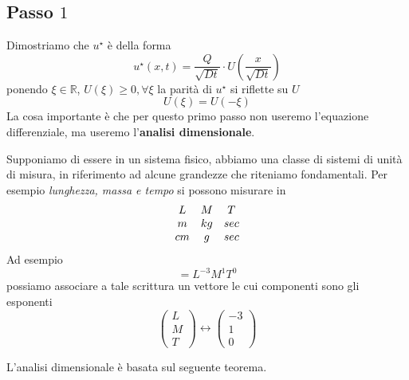 \documentclass[10pt,a4paper,twoside,openright]{book}
\begin{document}
\subsection{Passo \texorpdfstring{$1$}{1}}

Dimostriamo che $u^{\star }$ è della forma
\begin{equation*}
u^{\star }(x,t) =\frac{Q}{\sqrt{Dt}} \cdotp U\left(\frac{x}{\sqrt{Dt}}\right)
\end{equation*}
ponendo $\xi \in \mathbb{R}$, $U(\xi) \geqslant 0,\forall \xi $ la parità di $u^{\star }$ si riflette su $U$
\begin{equation*}
U(\xi) =U(-\xi)
\end{equation*}
La cosa importante è che per questo primo passo non useremo l'equazione differenziale, ma useremo l'\textbf{analisi dimensionale}.
\begin{oss}
 Supponiamo di essere in un sistema fisico, abbiamo una classe di sistemi di unità di misura, in riferimento ad alcune grandezze che riteniamo fondamentali. Per esempio \textit{lunghezza, massa e tempo} si possono misurare in
\begin{equation*}
\begin{array}{ c c c }
L & M & T\\
m & kg & sec\\
cm & g & sec
\end{array}
\end{equation*}
Ad esempio
\begin{equation*}
[ \rho ] =L^{-3} M^{1} T^{0}
\end{equation*}
possiamo associare a tale scrittura un vettore le cui componenti sono gli esponenti
\begin{equation*}
\begin{pmatrix}
L\\
M\\
T
\end{pmatrix} \leftrightarrow \begin{pmatrix}
-3\\
1\\
0
\end{pmatrix}
\end{equation*}
\end{oss}
L'analisi dimensionale è basata sul seguente teorema.
\end{document}
